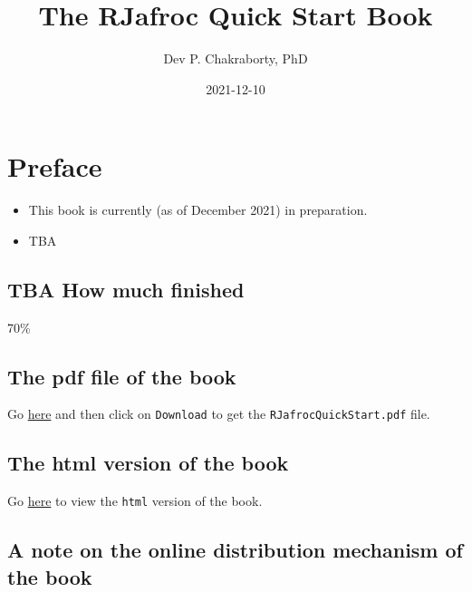 \documentclass[
]{book}
\title{The RJafroc Quick Start Book}
\author{Dev P. Chakraborty, PhD}
\date{2021-12-10}
\providecommand{\tightlist}{%
  \setlength{\itemsep}{0pt}\setlength{\parskip}{0pt}}
\begin{document}
\maketitle

{
\setcounter{tocdepth}{1}
\tableofcontents
}
\hypertarget{preface}{%
\chapter*{Preface}\label{preface}}

\begin{itemize}
\tightlist
\item
  This book is currently (as of December 2021) in preparation.
\item
  TBA
\end{itemize}

\hypertarget{tba-how-much-finished}{%
\section*{TBA How much finished}\label{tba-how-much-finished}}

70\%

\hypertarget{the-pdf-file-of-the-book}{%
\section*{The pdf file of the book}\label{the-pdf-file-of-the-book}}

Go \href{https://github.com/dpc10ster/RJafrocQuickStart/blob/gh-pages/RJafrocQuickStart.pdf}{here} and then click on \texttt{Download} to get the \texttt{RJafrocQuickStart.pdf} file.

\hypertarget{the-html-version-of-the-book}{%
\section*{The html version of the book}\label{the-html-version-of-the-book}}

Go \href{https://dpc10ster.github.io/RJafrocQuickStart/}{here} to view the \texttt{html} version of the book.

\hypertarget{a-note-on-the-online-distribution-mechanism-of-the-book}{%
\section*{A note on the online distribution mechanism of the book}\label{a-note-on-the-online-distribution-mechanism-of-the-book}}
\end{document}
